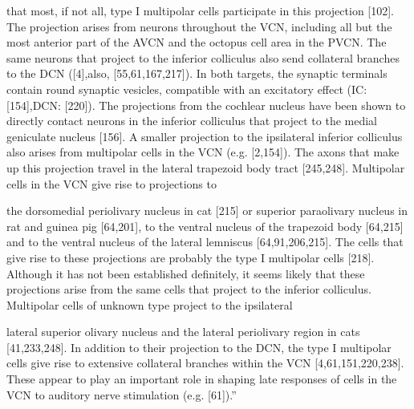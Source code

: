 \documentclass[10pt,a4paper]{article}
\begin{document}
that most, if not all, type I multipolar cells participate in this projection
[102]. The projection arises from neurons throughout the VCN, including all but
the most anterior part of the AVCN and the octopus cell area in the PVCN. The
same neurons that project to the inferior colliculus also send collateral
branches to the DCN ([4],also, [55,61,167,217]). In both targets, the synaptic
terminals contain round synaptic vesicles, compatible with an excitatory effect
(IC: [154],DCN: [220]). The projections from the cochlear nucleus have been
shown to directly contact neurons in the inferior colliculus that project to the
medial geniculate nucleus [156]. A smaller projection to the ipsilateral
inferior colliculus also arises from multipolar cells in the VCN
(e.g. [2,154]). The axons that make up this projection travel in the lateral
trapezoid body tract [245,248]. Multipolar cells in the VCN give rise to
projections to

the dorsomedial periolivary nucleus in cat [215] or superior paraolivary nucleus
in rat and guinea pig [64,201], to the ventral nucleus of the trapezoid body
[64,215] and to the ventral nucleus of the lateral lemniscus
[64,91,206,215]. The cells that give rise to these projections are probably the
type I multipolar cells [218]. Although it has not been established definitely,
it seems likely that these projections arise from the same cells that project to
the inferior colliculus. Multipolar cells of unknown type project to the
ipsilateral

lateral superior olivary nucleus and the lateral periolivary region in cats
[41,233,248]. In addition to their projection to the DCN, the type I multipolar
cells give rise to extensive collateral branches within the VCN
[4,61,151,220,238]. These appear to play an important role in shaping late
responses of cells in the VCN to auditory nerve stimulation
(e.g. [61]).{\textquotedblright}

\citep{WangSachs:1992}
\end{document}
